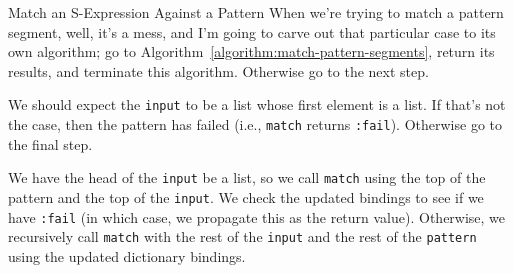 \begin{algorithm}{Match an S-Expression Against a Pattern}
\label{algorithm:step:lisp:matching:trying-to-match-pattern-segment}
When we're trying to match a pattern segment, well, it's a mess, and I'm
going to carve out that particular case to its own algorithm;
go to Algorithm~\ref{algorithm:match-pattern-segments}, return its
results, and terminate this algorithm. Otherwise go to the next step.

We should expect the
\lstinline[language=lisp]{input} to be a list whose first element is a list.
If that's not the case, then the pattern has failed (i.e.,
\lstinline[language=lisp]{match} returns \lstinline[language=lisp]{:fail}).
Otherwise go to the final step.

We have the head of the \lstinline[language=lisp]{input} be
a list, so we call \lstinline[language=lisp]{match} using the top of the
pattern and the top of the \lstinline[language=lisp]{input}. We check
the updated bindings to see if we have \lstinline[language=lisp]{:fail}
(in which case, we propagate this as the return value). Otherwise, we
recursively call \lstinline[language=lisp]{match}
with the rest of the \lstinline[language=lisp]{input} and the
rest of the \lstinline[language=lisp]{pattern} using the updated
dictionary bindings.\quad\qedsymbol
\end{algorithm}

